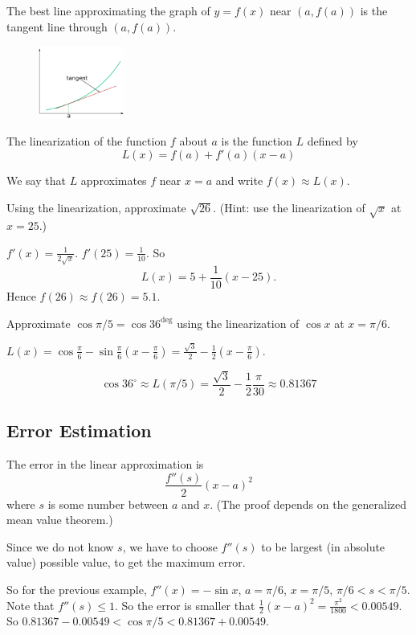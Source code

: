 \documentclass[../calc1-main.tex]{subfiles}
\begin{document}
The best line approximating the graph of $y=f(x)$ near $(a, f(a))$ is the tangent line through $(a, f(a))$.

\begin{figure}[H]
  \centering
  \includegraphics[width=0.25\textwidth]{figures/4-7-lin-approx.png}
\end{figure}

The linearization of the function $f$ about $a$ is the function $L$ defined by
\[
  L(x) = f(a) + f'(a)(x-a)
\]

We say that $L$ approximates $f$ near $x=a$ and write $f(x) \approx L(x)$.

\begin{example}
  Using the linearization, approximate $\sqrt{26}$. (Hint: use the linearization of $\sqrt{x}$ at $x=25$.)
\end{example}
\begin{solution}
  $f'(x) = \frac{1}{2\sqrt{x}}$. $f'(25) = \frac{1}{10}$. So
  \[
    L(x) = 5 + \frac{1}{10} (x-25).
  \]
  Hence $f(26) \approx f(26) = 5.1$.
\end{solution}

\begin{example}
  Approximate $\cos \pi/5 = \cos 36^{\deg}$ using the linearization of $\cos x$ at $x=\pi/6$.
\end{example}

\begin{solution}
  $L(x) = \cos\frac{\pi}{6} - \sin \frac{\pi}{6}(x-\frac{\pi}{6}) = \frac{\sqrt{3}}{2} - \frac{1}{2}(x-\frac{\pi}{6})$.

  \[
    \cos 36^{\circ} \approx L(\pi/5) = \frac{\sqrt{3}}{2} - \frac{1}{2} \frac{\pi}{30} \approx 0.81367
  \]
\end{solution}

\subsection*{Error Estimation}
The error in the linear approximation is
\[
  \frac{f''(s)}{2}(x-a)^2
\]
where $s$ is some number between $a$ and $x$. (The proof depends on the generalized mean value theorem.)

Since we do not know $s$, we have to choose $f''(s)$ to be largest (in absolute value) possible value, to get the maximum error.

So for the previous example, $f''(x) = -\sin x$, $a=\pi/6$, $x=\pi/5$, $\pi/6<s<\pi/5$. Note that $f''(s) \le 1$. So the error is smaller that $\frac{1}{2}(x-a)^2 = \frac{\pi^2}{1800}<0.00549$. So $0.81367 -0.00549 < \cos \pi/5 < 0.81367 + 0.00549$.
\end{document}
